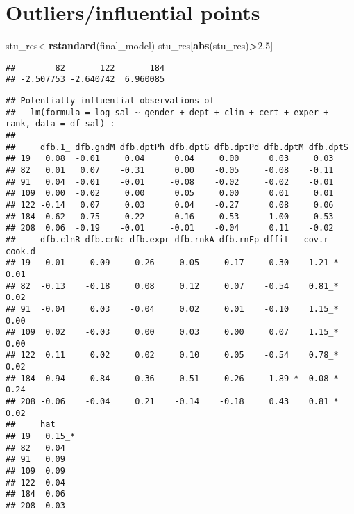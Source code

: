 \documentclass[]{article}
\newenvironment{Shaded}{\begin{snugshade}}{\end{snugshade}}
\newcommand{\FloatTok}[1]{\textcolor[rgb]{0.00,0.00,0.81}{#1}}
\newcommand{\KeywordTok}[1]{\textcolor[rgb]{0.13,0.29,0.53}{\textbf{#1}}}
\newcommand{\NormalTok}[1]{#1}
\newcommand{\OperatorTok}[1]{\textcolor[rgb]{0.81,0.36,0.00}{\textbf{#1}}}
\newcommand{\StringTok}[1]{\textcolor[rgb]{0.31,0.60,0.02}{#1}}
\begin{document}
\hypertarget{outliersinfluential-points}{%
\section{Outliers/influential points}\label{outliersinfluential-points}}

\begin{Shaded}
\begin{Highlighting}[]
\NormalTok{stu_res<-}\KeywordTok{rstandard}\NormalTok{(final_model)}
\NormalTok{stu_res[}\KeywordTok{abs}\NormalTok{(stu_res)}\OperatorTok{>}\FloatTok{2.5}\NormalTok{]}
\end{Highlighting}
\end{Shaded}

\begin{verbatim}
##        82       122       184 
## -2.507753 -2.640742  6.960085
\end{verbatim}

\begin{Shaded}
\end{Shaded}

\begin{verbatim}
## Potentially influential observations of
##   lm(formula = log_sal ~ gender + dept + clin + cert + exper +      rank, data = df_sal) :
## 
##     dfb.1_ dfb.gndM dfb.dptPh dfb.dptG dfb.dptPd dfb.dptM dfb.dptS
## 19   0.08  -0.01     0.04      0.04     0.00      0.03     0.03   
## 82   0.01   0.07    -0.31      0.00    -0.05     -0.08    -0.11   
## 91   0.04  -0.01    -0.01     -0.08    -0.02     -0.02    -0.01   
## 109  0.00  -0.02     0.00      0.05     0.00      0.01     0.01   
## 122 -0.14   0.07     0.03      0.04    -0.27      0.08     0.06   
## 184 -0.62   0.75     0.22      0.16     0.53      1.00     0.53   
## 208  0.06  -0.19    -0.01     -0.01    -0.04      0.11    -0.02   
##     dfb.clnR dfb.crNc dfb.expr dfb.rnkA dfb.rnFp dffit   cov.r   cook.d
## 19  -0.01    -0.09    -0.26     0.05     0.17    -0.30    1.21_*  0.01 
## 82  -0.13    -0.18     0.08     0.12     0.07    -0.54    0.81_*  0.02 
## 91  -0.04     0.03    -0.04     0.02     0.01    -0.10    1.15_*  0.00 
## 109  0.02    -0.03     0.00     0.03     0.00     0.07    1.15_*  0.00 
## 122  0.11     0.02     0.02     0.10     0.05    -0.54    0.78_*  0.02 
## 184  0.94     0.84    -0.36    -0.51    -0.26     1.89_*  0.08_*  0.24 
## 208 -0.06    -0.04     0.21    -0.14    -0.18     0.43    0.81_*  0.02 
##     hat    
## 19   0.15_*
## 82   0.04  
## 91   0.09  
## 109  0.09  
## 122  0.04  
## 184  0.06  
## 208  0.03
\end{verbatim}
\end{document}
